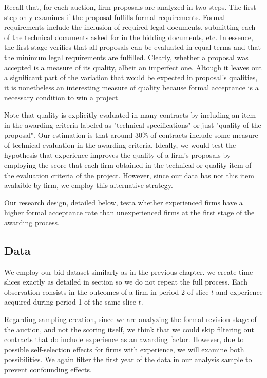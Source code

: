 Recall that, for each auction, firm proposals are analyzed in two steps. The first step only examines if the proposal fulfills formal requirements. Formal requirements include the inclusion of required legal documents, submitting each of the technical documents asked for in the bidding documents, etc. In essence, the first stage verifies that all proposals can be evaluated in equal terms and that the minimum legal requirements are fulfilled. Clearly, whether a proposal was accepted is a measure of its quality, albeit an imperfect one. Altough it leaves out a significant part of the variation that would be expected in proposal's qualities, it is nonetheless an interesting measure of quality because formal acceptance is a necessary condition to win a project.

Note that quality is explicitly evaluated in many contracts by including an item in the awarding criteria labeled as "technical specifications" or just "quality of the proposal". Our estimation is that around 30\% of contracts include some measure of technical evaluation in the awarding criteria.  Ideally, we would test the hypothesis that experience improves the quality of a firm's proposals by employing the score that each firm obtained in the technical or quality item of the evaluation criteria of the project. However, since our data has not this item avalaible by firm, we employ this alternative strategy.

Our research design, detailed below, testa whether experienced firms have a higher formal acceptance rate than unexperienced firms at the first stage of the awarding process.

\subsection{Data}
We employ our bid dataset similarly as in the previous chapter. we create time slices exactly as detailed in section so we do not repeat the full process.  Each observation consists in the outcomes of a firm in period 2 of slice $t$ and experience acquired during period 1 of the same slice $t$.

Regarding sampling creation, since we are analyzing the formal revision stage of the auction, and not the scoring itself, we think that we could skip  filtering out contracts that do include experience as an awarding factor. However, due to possible self-selection effects for firms with experience, we will examine both possibilities. We again filter the first year of the data in our analysis sample to prevent confounding effects.

